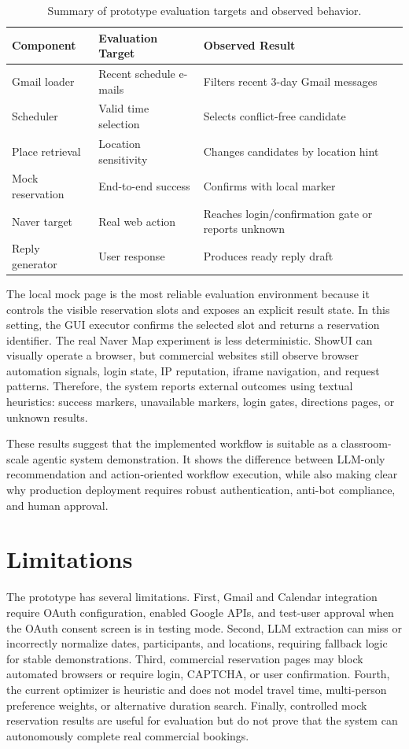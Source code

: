 \documentclass[sigconf,nonacm]{acmart}
\begin{document}
\begin{table}[t]
\centering
\small
\begin{tabular}{lll}
\toprule
Component & Evaluation Target & Observed Result \\
\midrule
Gmail loader & Recent schedule e-mails & Filters recent 3-day Gmail messages \\
Scheduler & Valid time selection & Selects conflict-free candidate \\
Place retrieval & Location sensitivity & Changes candidates by location hint \\
Mock reservation & End-to-end success & Confirms with local marker \\
Naver target & Real web action & Reaches login/confirmation gate or reports unknown \\
Reply generator & User response & Produces ready reply draft \\
\bottomrule
\end{tabular}
\caption{Summary of prototype evaluation targets and observed behavior.}
\label{tab:evaluation}
\end{table}

The local mock page is the most reliable evaluation environment because it controls the visible reservation slots and exposes an explicit result state. In this setting, the GUI executor confirms the selected slot and returns a reservation identifier. The real Naver Map experiment is less deterministic. ShowUI can visually operate a browser, but commercial websites still observe browser automation signals, login state, IP reputation, iframe navigation, and request patterns. Therefore, the system reports external outcomes using textual heuristics: success markers, unavailable markers, login gates, directions pages, or unknown results.

These results suggest that the implemented workflow is suitable as a classroom-scale agentic system demonstration. It shows the difference between LLM-only recommendation and action-oriented workflow execution, while also making clear why production deployment requires robust authentication, anti-bot compliance, and human approval.

\section{Limitations}
The prototype has several limitations. First, Gmail and Calendar integration require OAuth configuration, enabled Google APIs, and test-user approval when the OAuth consent screen is in testing mode. Second, LLM extraction can miss or incorrectly normalize dates, participants, and locations, requiring fallback logic for stable demonstrations. Third, commercial reservation pages may block automated browsers or require login, CAPTCHA, or user confirmation. Fourth, the current optimizer is heuristic and does not model travel time, multi-person preference weights, or alternative duration search. Finally, controlled mock reservation results are useful for evaluation but do not prove that the system can autonomously complete real commercial bookings.
\end{document}
